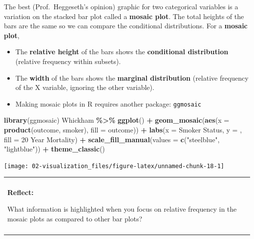 \documentclass[
]{book}
\newenvironment{Shaded}{\begin{snugshade}}{\end{snugshade}}
\newcommand{\AttributeTok}[1]{\textcolor[rgb]{0.13,0.29,0.53}{#1}}
\newcommand{\FunctionTok}[1]{\textcolor[rgb]{0.13,0.29,0.53}{\textbf{#1}}}
\newcommand{\NormalTok}[1]{#1}
\newcommand{\SpecialCharTok}[1]{\textcolor[rgb]{0.81,0.36,0.00}{\textbf{#1}}}
\newcommand{\StringTok}[1]{\textcolor[rgb]{0.31,0.60,0.02}{#1}}
\providecommand{\tightlist}{%
  \setlength{\itemsep}{0pt}\setlength{\parskip}{0pt}}
\newenvironment{reflect}
{
    \begin{center}
    
    \begin{tabular}{|p{0.8\textwidth}|}
    \rowcolor{LightBlue}
    \hline\\
    \rowcolor{LightBlue}
    \textbf{Reflect:}
}
{
    \\\rowcolor{LightBlue}
    \\\hline
    \end{tabular} 
    \end{center}
}
\begin{document}
The best (Prof.~Heggeseth's opinion) graphic for two categorical variables is a variation on the stacked bar plot called a \textbf{mosaic plot}. The total heights of the bars are the same so we can compare the conditional distributions. For a \textbf{mosaic plot},

\begin{itemize}
\tightlist
\item
  The \textbf{relative height} of the bars shows the \textbf{conditional distribution} (relative frequency within subsets).
\item
  The \textbf{width} of the bars shows the \textbf{marginal distribution} (relative frequency of the X variable, ignoring the other variable).
\item
  Making mosaic plots in R requires another package: \texttt{ggmosaic}
\end{itemize}

\begin{Shaded}
\begin{Highlighting}[]
\FunctionTok{library}\NormalTok{(ggmosaic)}
\NormalTok{Whickham }\SpecialCharTok{\%\textgreater{}\%}
    \FunctionTok{ggplot}\NormalTok{() }\SpecialCharTok{+}
    \FunctionTok{geom\_mosaic}\NormalTok{(}\FunctionTok{aes}\NormalTok{(}\AttributeTok{x =} \FunctionTok{product}\NormalTok{(outcome, smoker), }\AttributeTok{fill =}\NormalTok{ outcome)) }\SpecialCharTok{+}
    \FunctionTok{labs}\NormalTok{(}\AttributeTok{x =} \StringTok{\textquotesingle{}Smoker Status\textquotesingle{}}\NormalTok{, }\AttributeTok{y =} \StringTok{\textquotesingle{}\textquotesingle{}}\NormalTok{, }\AttributeTok{fill =} \StringTok{\textquotesingle{}20 Year Mortality\textquotesingle{}}\NormalTok{) }\SpecialCharTok{+} 
    \FunctionTok{scale\_fill\_manual}\NormalTok{(}\AttributeTok{values =} \FunctionTok{c}\NormalTok{(}\StringTok{"steelblue"}\NormalTok{, }\StringTok{"lightblue"}\NormalTok{)) }\SpecialCharTok{+} 
    \FunctionTok{theme\_classic}\NormalTok{()}
\end{Highlighting}
\end{Shaded}

\begin{center}\texttt{[image: 02-visualization\_files/figure-latex/unnamed-chunk-18-1]} \end{center}

\begin{reflect}
What information is highlighted when you focus on relative frequency in
the mosaic plots as compared to other bar plots?
\end{reflect}
\end{document}
